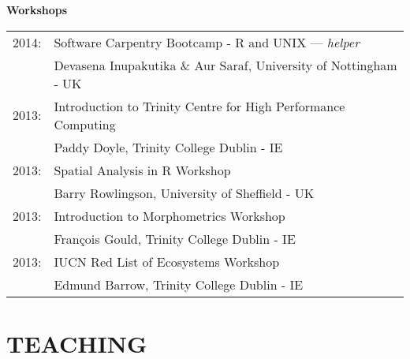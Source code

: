 \documentclass[10pt,a4paper]{article}
\begin{document}
{\raggedright\textbf{Workshops}\\[1.5ex]
\begin{tabular}{ll}
2014: & Software Carpentry Bootcamp - R and UNIX --- \textit{helper}\\
& Devasena Inupakutika \& Aur Saraf, University of Nottingham - UK\\
2013: & Introduction to Trinity Centre for High Performance Computing\\
& Paddy Doyle, Trinity College Dublin - IE\\
2013: & Spatial Analysis in R Workshop\\
& Barry Rowlingson, University of Sheffield - UK\\
2013: & Introduction to Morphometrics Workshop\\
& Fran\c{c}ois Gould, Trinity College Dublin - IE\\
2013: & IUCN Red List of Ecosystems Workshop\\
& Edmund Barrow, Trinity College Dublin - IE\\

\end{tabular}
\bigskip

\section{TEACHING}
\bigskip

}
\end{document}
